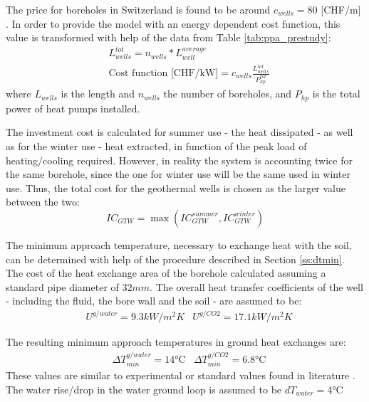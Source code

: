 \documentclass{article}
\begin{document}
The price for boreholes in Switzerland is found to be around $c_{wells} = 80$ [CHF/m] \cite{bawos.chMitErdsondenbohrungenKosten2018}. 
In order to provide the model with an energy dependent cost function, this value is transformed with help of the data from Table \ref{tab:ppa_prestudy}:
\begin{align}
&  L_{wells}^{tot} = n_{wells} * L_{well}^{average} \\
& 	\text{Cost function [CHF/kW]} = c_{wells} \frac{L_{wells}^{tot}}{P_{hp}^{tot}}
\end{align}
where $L_{wells}$ is the length and $n_{wells}$ the number of boreholes, and $P_{hp}$ is the total power of heat pumps installed. 

The investment cost is calculated for summer use - the heat dissipated - as well as for the winter use - heat extracted, in function of the peak load of heating/cooling required. However, in reality the system is accounting twice for the same borehole, since the one for winter use will be the same used in winter use. Thus, the total cost for the geothermal wells is chosen as the larger value between the two:
\begin{equation}
IC_{GTW} = 	\max \left( IC_{GTW}^{summer}, IC_{GTW}^{winter} \right) 
\end{equation}

The minimum approach temperature, necessary to exchange heat with the soil, can be determined with help of the procedure described in Section \ref{ss:dtmin}. 
The cost of the heat exchange area of the borehole calculated assuming a standard pipe diameter of $32 mm$\cite{siaSIA384Sondes2010, kruseStatusDevelopmentResearcha}.
The overall heat transfer coefficients of the well - including the fluid, the bore wall and the soil - are assumed to be\cite{kruseStatusDevelopmentResearcha}:
\begin{align}
	& U^{g/water} = 9.3 kW/m^2K
	& U^{g/CO2} = 17.1 kW/m^2K
\end{align}

The resulting minimum approach temperatures in ground heat exchanges are:
\begin{align}
	&\Delta T_{min}^{g/water} = 14 \si{\celsius}
	&\Delta T_{min}^{g/CO2} = 6.8 \si{\celsius}
\end{align}
These values are similar to experimental or standard values found in literature \cite{siaSIA384Sondes2010, lamarcheReviewMethodsEvaluate2010}.\\

The water rise/drop in the water ground loop is assumed to be $dT_{water} = 4 \si{\celsius}$ \cite{siaSIA384Sondes2010}\\
\end{document}
